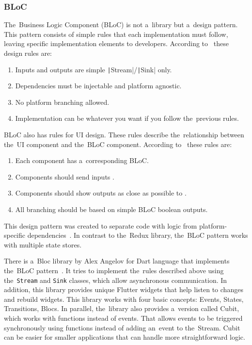 \subsubsection{BLoC}

The~Business Logic Component (BLoC) is not a~library but a~design pattern.
This pattern consists of simple rules that each implementation must follow, leaving specific implementation elements to developers.
According to~\cite{paolosoares_2018_flutter} these design rules are:

\begin{enumerate}
    \item Inputs and outputs are simple
    \texttt|Stream|/\texttt|Sink| only.
    \item Dependencies must be injectable and platform agnostic.
    \item No platform branching allowed.
    \item Implementation can be whatever you want
    if you follow the~previous rules.
\end{enumerate}

BLoC also has rules for UI design.
These rules describe the~relationship between the~UI component and the~BLoC component.
According to~\cite{paolosoares_2018_flutter} these rules are:

\begin{enumerate}
    \item Each  component has a~corresponding BLoC.
    \item Components should send inputs .
    \item Components should show outputs as close as possible to .
    \item All branching should be based on simple BLoC boolean outputs.
\end{enumerate}

This design pattern was created to separate code with logic
from platform-specific dependencies~\cite{paolosoares_2018_flutter}.
In contrast to the~Redux library, the~BLoC pattern works with multiple state stores.

There is a~Bloc library by Alex Angelov for Dart language that implements the~BLoC pattern~\cite{angelov_2022_bloc}.
It tries to implement the~rules described above using the~\texttt{Stream} and \texttt{Sink} classes, which allow asynchronous communication.
In addition, this library provides unique Flutter widgets that help listen to changes and rebuild widgets.
This library works with four basic concepts: Events, States, Transitions, Blocs.
In parallel, the~library also provides a~version called Cubit, which works with functions instead of events.
That allows events to be triggered synchronously using functions instead of adding an~event to the~Stream.
Cubit can be easier for smaller applications that can handle more straightforward logic.

